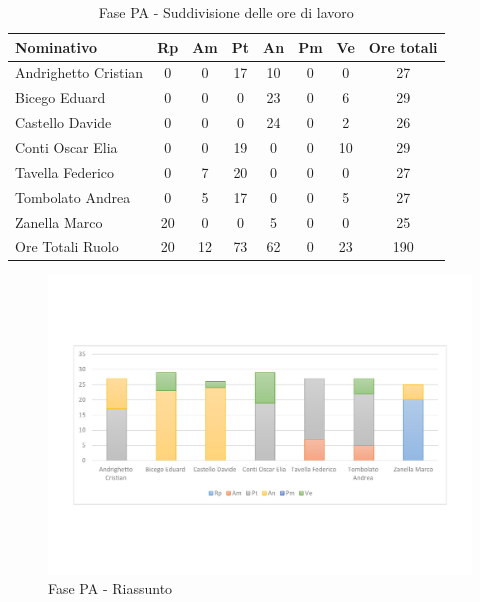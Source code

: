 \documentclass[../PianoProgetto.tex]{subfiles}
\begin{document}
	\begin{table}[h]
		\centering
	
		\begin{tabularx}{\textwidth}{l  * {6}{C}  c}
			\toprule
			\textbf{Nominativo} & \textbf{Rp} & \textbf{Am} & \textbf{Pt} 
						& \textbf{An} & \textbf{Pm} & \textbf{Ve} & \textbf{Ore totali} \\
			\midrule
			Andrighetto Cristian & 0 & 0 &	17 & 10 & 0 & 0 & 27 \\
			Bicego Eduard & 0 & 0 & 0 & 23 & 0 & 6 & 29 \\
			Castello Davide & 0 & 0 & 0 & 24 & 0 & 2 & 26 \\
			Conti Oscar Elia & 0 & 0 &	19 & 0 & 0 & 10 & 29 \\
			Tavella Federico &	0 & 7 & 20 & 0 & 0 & 0 & 27 \\
			Tombolato Andrea & 0 & 5 &	17 & 0 & 0 & 5 & 27 \\
			Zanella Marco & 20 & 0 & 0 & 5 & 0 & 0 & 25 \\
			\midrule			
			Ore Totali Ruolo & 20 & 12 & 73 & 62 & 0 & 23 & 190 \\
			\bottomrule
			
		\end{tabularx}
		\caption{Fase PA - Suddivisione delle ore di lavoro}
		\label{tab:fasePA_ore}
	\end{table}
\vfill	
	
	\begin{figure}[!h]
		\centering
		\includegraphics[width=\textwidth , trim=2cm 5cm 2cm 5cm]{grafici/PA/PA-ore-persona}
			\caption{Fase PA - Riassunto}
		\label{fig:BarChart-fasePA_ore}
	\end{figure}
\vfill	
\newpage
	
\end{document}
